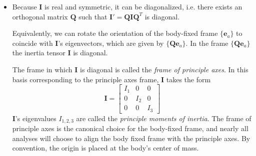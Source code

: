 \documentclass[11pt, a4paper]{article}
\newcommand{\e}{\bm{e}} %
\newcommand{\mat}[1]{\mathbf{#1}}
\begin{document}
\begin{itemize}
	\item Because $ \mathbf{I} $ is real and symmetric, it can be diagonalized, i.e. there exists an orthogonal matrix $ \mathbf{Q} $ such that $ \mathbf{I}' = \mathbf{Q} \mathbf{I} \mathbf{Q}^{T} $ is diagonal.
	
	Equivalently, we can rotate the orientation of the body-fixed frame $ \{\e_{a} \} $ to coincide with $ \mathbf{I} $'s eigenvectors, which are given by $\{ \mathbf{Q}\e_{a} \} $. In the frame $ \{\mat{Q}\e_{a} \} $ the inertia tensor $ \mathbf{I} $ is diagonal.
	
	The frame in which $ \mathbf{I} $ is diagonal is called the \textit{frame of principle axes}. In this basis corresponding to the principle axes frame, $ \mathbf{I} $ takes the form
	\[
		\mathbf{I} = 
		\begin{bmatrix}
			I_{1} & 0 & 0\\
			0 & I_{2} & 0\\
			0 & 0 & I_{3}
		\end{bmatrix}
	\]
	$ \mathbf{I} $'s eigenvalues $ I_{1, 2, 3} $ are called the \textit{principle moments of inertia}. The frame of principle axes is the canonical choice for the body-fixed frame, and nearly all analyses will choose to align the body fixed frame with the principle axes. By convention, the origin is placed at the body's center of mass.

\end{itemize}
\end{document}
